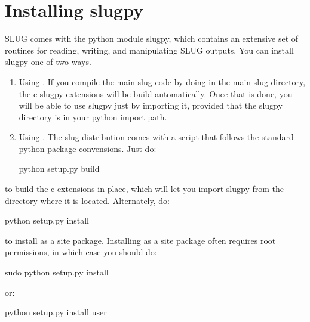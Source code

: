 \documentclass[letterpaper,10pt,english]{sphinxmanual}
\begin{document}
\section{Installing slugpy}
\label{\detokenize{slugpy:installing-slugpy}}
SLUG comes with the python module slugpy, which contains an extensive set of routines for reading, writing, and manipulating SLUG outputs. You can install slugpy one of two ways.
\begin{enumerate}
\item {} 
Using . If you compile the main slug code by doing  in the main slug directory, the c slugpy extensions will be build automatically. Once that is done, you will be able to use slugpy just by importing it, provided that the slugpy directory is in your python import path.

\item {} 
Using . The slug distribution comes with a  script that follows the standard python package convensions. Just do:

\begin{sphinxVerbatim}[commandchars=\\\{\}]
python setup.py build
\end{sphinxVerbatim}

\end{enumerate}

to build the c extensions in place, which will let you import slugpy from the directory where it is located. Alternately, do:

\begin{sphinxVerbatim}[commandchars=\\\{\}]
python setup.py install
\end{sphinxVerbatim}

to install as a site package. Installing as a site package often requires root permissions, in which case you should do:

\begin{sphinxVerbatim}[commandchars=\\\{\}]
sudo python setup.py install
\end{sphinxVerbatim}

or:

\begin{sphinxVerbatim}[commandchars=\\\{\}]
python setup.py install \PYGZhy{}\PYGZhy{}user
\end{sphinxVerbatim}
\end{document}
